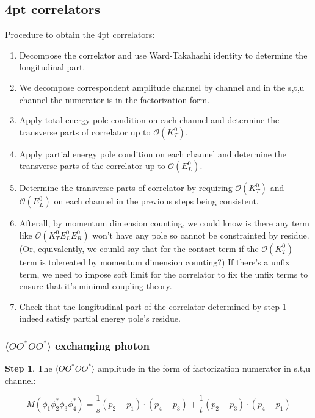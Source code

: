 \documentclass[11pt,a4paper]{article}
\begin{document}
\subsection{4pt correlators}
Procedure to obtain the 4pt correlators:
\begin{enumerate}
\item Decompose the correlator and use Ward-Takahashi identity to determine the longitudinal part.
\item We decompose correspondent amplitude channel by channel and in the s,t,u channel the numerator is in the factorization form.
\item Apply total energy pole condition on each channel and determine the transverse parts of correlator up to $\mathcal{O}(K_T^0)$.
\item Apply partial energy pole condition on each channel and determine the transverse parts of the correlator up to $\mathcal{O}(E_L^0)$.
\item Determine the transverse parts of correlator by requiring $\mathcal{O}(K_T^0)$ and $\mathcal{O}(E_L^0)$ on each channel in the previous steps being consistent.
\item Afterall, by momentum dimension counting, we could know is there any term like $\mathcal{O}(K_T^0E_L^0E_R^0)$ won't have any pole so cannot be constrainted by residue. (Or, equivalently, we counld say that for the contact term if the $\mathcal{O}(K_T^0)$ term is tolereated by momentum dimension counting?) If there's a unfix term, we need to impose soft limit for the correlator to fix the unfix terms to ensure that it's minimal coupling theory.
\item Check that the longitudinal part of the correlator determined by step 1 indeed satisfy partial energy pole's residue.
\end{enumerate}

\subsubsection{$\langle OO^*OO^* \rangle$ exchanging photon}

\textbf{Step 1}. The $\langle OO^*OO^* \rangle$ amplitude in the form of factorization numerator in s,t,u channel:

$$
M\left( \phi _{1} \phi _{2}^{*} \phi _{3} \phi _{4}^{*}\right) =\frac{1}{s}( p_{2} -p_{1}) \cdot ( p_{4} -p_{3}) +\frac{1}{t}( p_{2} -p_{3}) \cdot ( p_{4} -p_{1})
$$
\end{document}

